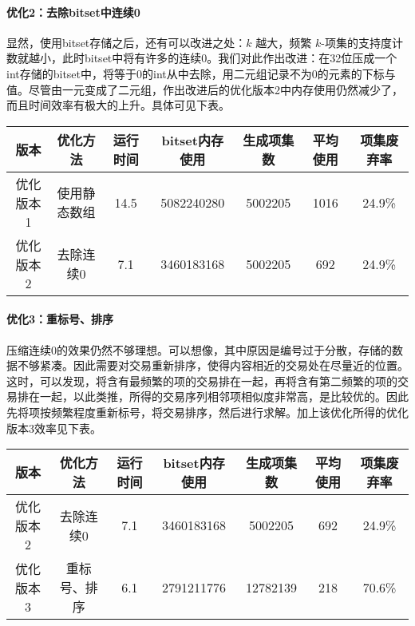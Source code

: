 \documentclass[a4paper,9pt]{article}
\begin{document}
\paragraph{优化2：去除bitset中连续0}
显然，使用bitset存储之后，还有可以改进之处：$k$ 越大，频繁 $k$-项集的支持度计数就越小，此时bitset中将有许多的连续0。我们对此作出改进：在32位压成一个int存储的bitset中，将等于0的int从中去除，用二元组记录不为0的元素的下标与值。尽管由一元变成了二元组，作出改进后的优化版本2中内存使用仍然减少了，而且时间效率有极大的上升。具体可见下表。
\begin{center}
	\begin{tabular}{ccccccc}
		版本&优化方法&运行时间&bitset内存使用&生成项集数&平均使用&项集废弃率\\\hline
		优化版本1&使用静态数组&14.5&5082240280&5002205&1016&24.9\%\\
		优化版本2&去除连续0&7.1&3460183168&5002205&692&24.9\%
	\end{tabular}
\end{center}

\paragraph{优化3：重标号、排序}
压缩连续0的效果仍然不够理想。可以想像，其中原因是编号过于分散，存储的数据不够紧凑。因此需要对交易重新排序，使得内容相近的交易处在尽量近的位置。这时，可以发现，将含有最频繁的项的交易排在一起，再将含有第二频繁的项的交易排在一起，以此类推，所得的交易序列相邻项相似度非常高，是比较优的。因此先将项按频繁程度重新标号，将交易排序，然后进行求解。加上该优化所得的优化版本3效率见下表。
\begin{center}
	\begin{tabular}{ccccccc}
		版本&优化方法&运行时间&bitset内存使用&生成项集数&平均使用&项集废弃率\\\hline
		优化版本2&去除连续0&7.1&3460183168&5002205&692&24.9\%\\
		优化版本3&重标号、排序&6.1&2791211776&12782139&218&70.6\%
	\end{tabular}
\end{center}
\end{document}
